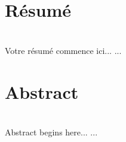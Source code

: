 \documentclass[12pt,a4paper]{article}
\begin{document}
\newpage 
\thispagestyle{empty}
\section*{Résumé}~\\[0.2cm]
Votre résumé commence ici...
   ...
\section*{Abstract}~\\[0.2cm]
 Abstract begins here...
   ...
\end{document}
